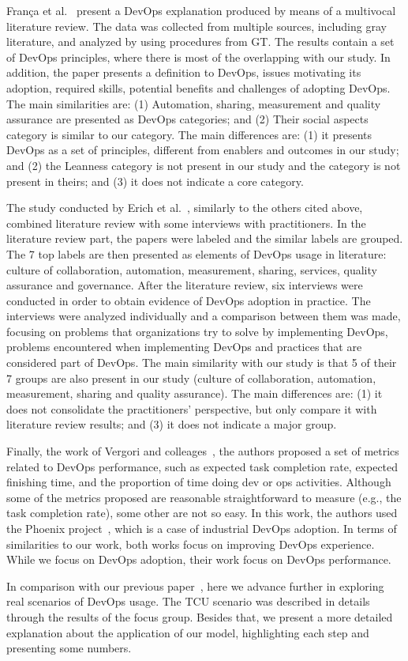 Fran\c{c}a et al.~\cite{characterizing_devops_sbes_2016} present a DevOps
explanation produced by means of a multivocal literature review. The data was collected
from multiple sources, including gray literature, and analyzed by using procedures
from GT. The results contain a set of DevOps principles, where
there is most of the overlapping with our study. In addition, the paper
presents a definition to DevOps, issues motivating its adoption, required skills,
potential benefits and challenges of adopting DevOps. The main similarities
are: (1) Automation, sharing, measurement and quality assurance are presented as
DevOps categories; and (2) Their social aspects category is similar to our
\cc category. The main differences are: (1) it presents DevOps as a
set of principles, different from enablers and outcomes in our study; and (2) the Leanness
category is not present in our study and the  category is not present
in theirs; and (3) it does not indicate a core category.

The study conducted by Erich et al.~\cite{qualitative_devops_journalsw_17},
similarly to the others cited above, combined literature review with some
interviews with practitioners. In the literature review part, the papers were
labeled and the similar labels are grouped. The 7 top labels are then presented
as elements of DevOps usage in literature: culture of collaboration, automation,
measurement, sharing, services, quality assurance and governance. After the literature
review, six interviews were conducted in order to obtain evidence of DevOps
adoption in practice. The interviews were analyzed individually and a comparison
between them was made, focusing on problems that organizations try to solve by
implementing DevOps, problems encountered when implementing DevOps and practices
that are considered part of DevOps. The main similarity with our study
is that 5 of their 7 groups are also present in our study (culture of collaboration,
automation, measurement, sharing and quality assurance). The main
differences are: (1) it does not consolidate the practitioners' perspective, but
only compare it with literature review results; and (3) it does not indicate a major group.

Finally, the work of Vergori and colleages~\cite{Vergori:2017:ICPE}, the
authors proposed a set of metrics related to DevOps performance, such as
expected task completion rate, expected finishing time, and the proportion of
time doing dev or ops activities. Although some of the metrics proposed are
reasonable straightforward to measure (e.g., the task completion rate), some
other are not so easy. In this work, the authors used the Phoenix project~\cite{Kim:2013:DevOps}, which
is a case of industrial DevOps adoption. In terms of similarities to our work,
both works focus on improving DevOps experience. While we focus on DevOps
adoption, their work focus on DevOps performance.

In comparison with our previous paper~\cite{Luz:2018:ESEM}, here we advance
further in exploring real scenarios of DevOps usage. The TCU scenario was
described in details through the results of the focus group. Besides that, we
present a more detailed explanation about the application of our model,
highlighting each step and presenting some numbers.
